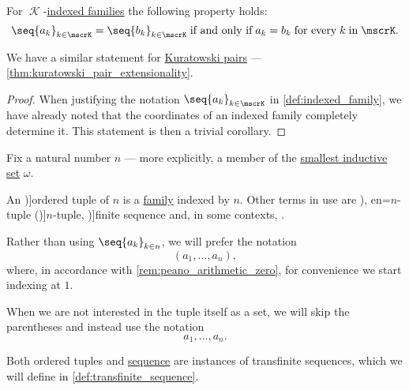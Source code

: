 \begin{proposition}\label{thm:indexed_family_extensionality}
  For \( \mscrK \)-\hyperref[def:indexed_family]{indexed families} the following property holds:
  \begin{equation}\label{eq:thm:indexed_family_extensionality}
    \seq{ a_k }_{k \in \mscrK} = \seq{ b_k }_{k \in \mscrK} \T{if and only if} a_k = b_k \T{for every} k \T{in} \mscrK.
  \end{equation}
\end{proposition}
\begin{comments}
  \item We have a similar statement for \hyperref[def:kuratowski_pair]{Kuratowski pairs} --- \cref{thm:kuratowski_pair_extensionality}.
\end{comments}
\begin{proof}
  When justifying the notation \( \seq{ a_k }_{k \in \mscrK} \) in \cref{def:indexed_family}, we have already noted that the coordinates of an indexed family completely determine it. This statement is then a trivial corollary.
\end{proof}

\begin{definition}\label{def:ordered_tuple}
  Fix a natural number \( n \) --- more explicitly, a member of the \hyperref[thm:smallest_inductive_set_existence]{smallest inductive set} \( \omega \).

  An \term[ru=кортеж (\cite[def. 1.2]{БелоусовТкачёв2004ДискретнаяМатематика})]{ordered tuple} of  \( n \) is a \hyperref[def:indexed_family]{family} indexed by \( n \). Other terms in use are \term[ru=упорядоченная \( n \)-ка (\cite[9]{Архангельский1988КанторовскаяТеорияМножеств}), en=\( n \)-tuple (\cite[51]{Enderton1977SetTheory})]{\( n \)-tuple}, \term[en=finite sequence (\cite[9]{Halmos1960NaiveSetTheory})]{finite sequence} and, in some contexts, .

  Rather than using \( \seq{ a_k }_{k \in n} \), we will prefer the notation
  \begin{equation*}
    (a_1, \ldots, a_n),
  \end{equation*}
  where, in accordance with \cref{rem:peano_arithmetic_zero}, for convenience we start indexing at \( 1 \).

  When we are not interested in the tuple itself as a set, we will skip the parentheses and instead use the notation
  \begin{equation*}
    a_1, \ldots, a_n.
  \end{equation*}
\end{definition}
\begin{comments}
  \item Both ordered tuples and \hyperref[def:sequence]{sequence} are instances of transfinite sequences, which we will define in \cref{def:transfinite_sequence}.
\end{comments}

